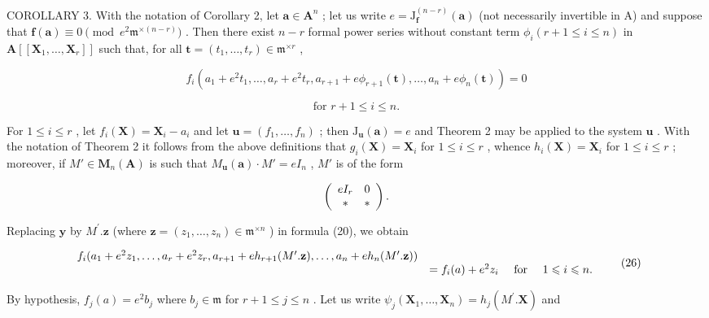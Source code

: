 COROLLARY 3. With the notation of Corollary 2, let \(\mathbf{a} \in \mathbf{A}^n\) ; let us write \(e = \mathrm{J}_{\mathbf{f}}^{(n-r)}(\mathbf{a})\) (not necessarily invertible in A) and suppose that \(\mathbf{f}(\mathbf{a}) \equiv 0 \pmod{e^2\mathfrak{m}^{\times(n-r)}}\) . Then there exist \(n - r\) formal power series without constant term \(\phi_i (r + 1 \leqslant i \leqslant n)\) in \(\mathbf{A}[[\mathbf{X}_1, \ldots, \mathbf{X}_r]]\) such that, for all \(\mathbf{t} = (t_1, \ldots, t_r) \in \mathfrak{m}^{\times r}\) ,

\[
f _ {i} \left(a _ {1} + e ^ {2} t _ {1}, \dots , a _ {r} + e ^ {2} t _ {r}, a _ {r + 1} + e \phi_ {r + 1} (\mathbf {t}), \dots , a _ {n} + e \phi_ {n} (\mathbf {t})\right) = 0
\]

\[
\text{for } r + 1 \leqslant i \leqslant n.
\]

For \(1 \leqslant i \leqslant r\) , let \(f_{i}(\mathbf{X}) = \mathbf{X}_{i} - a_{i}\) and let \(\mathbf{u} = (f_{1}, \ldots, f_{n})\) ; then \(\mathrm{J}_{\mathbf{u}}(\mathbf{a}) = e\) and Theorem 2 may be applied to the system \(\mathbf{u}\) . With the notation of Theorem 2 it follows from the above definitions that \(g_{i}(\mathbf{X}) = \mathbf{X}_{i}\) for \(1 \leqslant i \leqslant r\) , whence \(h_{i}(\mathbf{X}) = \mathbf{X}_{i}\) for \(1 \leqslant i \leqslant r\) ; moreover, if \(M' \in \mathbf{M}_{n}(\mathbf{A})\) is such that \(M_{\mathbf{u}}(\mathbf{a}) \cdot M' = eI_{n}\) , \(M'\) is of the form

\[
\left( \begin{array}{c c} e I _ {r} & 0 \\ * & * \end{array} \right).
\]

Replacing \(\mathbf{y}\) by \(M^{\prime}.\mathbf{z}\) (where \(\mathbf{z} = (z_{1},\ldots ,z_{n})\in \mathfrak{m}^{\times n}\) ) in formula (20), we obtain

\[
\begin{array}{r l} f _ {i} (a _ {1} + e ^ {2} z _ {1}, \dots , a _ {r} + e ^ {2} z _ {r}, a _ {r + 1} + e h _ {r + 1} (M ^ {\prime}. \mathbf {z}), \dots , a _ {n} + e h _ {n} (M ^ {\prime}. \mathbf {z})) \\ & = f _ {i} (a) + e ^ {2} z _ {i} \quad \text { for } \quad 1 \leqslant i \leqslant n. \end{array}\tag{26}
\]

By hypothesis, \(f_{j}(a) = e^{2}b_{j}\) where \(b_{j} \in \mathfrak{m}\) for \(r + 1 \leqslant j \leqslant n\) . Let us write \(\psi_{j}(\mathbf{X}_{1},\ldots ,\mathbf{X}_{n}) = h_{j}(M^{\prime}.\mathbf{X})\) and


